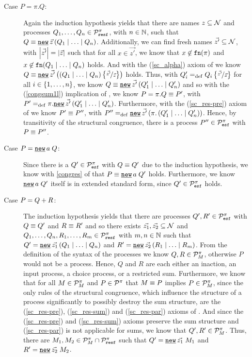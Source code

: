 \begin{prf}
\begin{description}
\begin{description}
\item[Case $P=\pi.Q$:] Again the induction hypothesis yields that there are names $z\subseteq\mathcal N$ and processes $Q_1,\ldots,Q_n\in\mathcal P^{\pi}_{\mathtt{resf}}$, with $n\in\mathbb N$, such that $Q\struct{}\procres[()]{\vec{z}}{\procpar{Q_1}{\procpar{\ldots}{Q_n}}}$. Additionally, we can find fresh names $\vec{z'}\subseteq\mathcal N$, with $\left|\vec{z'}\right|=\left|\vec{z}\right|$ such that for all $x\in{}\vec{z'}$, we know that $x\not\in\mathtt{fn}(\pi)$ and $x\not\in\mathtt{fn}(Q_1 \mid \ldots \mid Q_n)$ holds. And with the (\ref{sc_alpha}) axiom of  we know $Q\struct{}\procres[()]{\vec{z'}}{\left(\procpar{Q_1}{\procpar{\ldots}{Q_n}}\right)\subs{\vec{z'}}{\vec{z}}}$ holds. Thus, with $Q_i'=_{\mathrm{def}}{}Q_i\left\{\nicefrac{\vec{z'}}{\vec{z}}\right\}$ for all $i\in\set{1,\ldots,n}$, we know $Q\struct{}\procres[()]{\vec{z'}}{\procpar{Q_1'}{\procpar{\ldots}{Q_n'}}}$ and so with the (\ref{congsum1l}) implication of , we know $P=\pi.Q\equiv{}{}P'$, with $P'\define\pi.\procres[()]{\vec{z'}}{\procpar{Q_1'}{\procpar{\ldots}{Q_n'}}}$. Furthermore, with the (\ref{sc_res-pre}) axiom of  we know $
P'\equiv{}{}P''$, with $P''\define\procres[()]{\vec{z'}}{\pi.\left(\procpar{Q_1'}{\procpar{\ldots}{Q_n'}}\right)}$. Hence, by transitivity of the structural congruence, there is a process $P''\in\mathcal P^{\pi}_{\mathtt{esf}}$ with $P\equiv{}{}P''$.

\item[Case $P=\procres{a}{Q}$:] Since there is a $Q'\in\mathcal P^{\pi}_{\mathtt{esf}}$ with $Q\equiv{}{}Q'$ due to the induction hypothesis, we know with \ref{congres} of  that $\struct{P}{\procres{a}{Q'}}$ holds. Furthermore, we know $\procres{a}{Q'}$ itself is in extended standard form, since $Q'\in\mathcal P^{\pi}_{\mathtt{esf}}$ holds.

\item[Case $P=Q + R$:] The induction hypothesis yields that there are processes $Q',R'\in\mathcal P^{\pi}_{\mathtt{esf}}$ with $Q\equiv{}{}Q'$ and $R\equiv{}{}R'$ and so there exists $\vec{z_1},\vec{z_2}\subseteq\mathcal N$ and $Q_1,\ldots,Q_n,R_1,\ldots,R_m\in\mathcal P^{\pi}_{\mathtt{resf}}$ with $m,n\in\mathbb N$ such that $Q'=\procres[()]{\vec{z_1}}{\procpar{Q_1}{\procpar{\ldots}{Q_n}}}$ and $R'=\procres[()]{\vec{z_2}}{\procpar{R_1}{\procpar{\ldots}{R_m}}}$. From the definition of the syntax of the \picalc{} processes we know $Q,R\in\mathcal P^{\pi}_{M}$, otherwise $P$ would not be a process. Hence, $Q$ and $R$ are each either an inaction, an input process, a choice process, or a restricted sum. Furthermore, we know that for all $M\in\mathcal P^{\pi}_{M}$ and $P\in\mathcal P^{\pi}$ that $M\equiv{}{}P$ implies $P\in\mathcal P^{\pi}_{M}$, since the only rules of the structural congruence, which influence the structure of a process significantly to possibly destroy the sum structure, are the (\ref{sc_res-pre}), (\ref{sc_res-sum}) and (\ref{sc_res-par}) axioms of . And since the (\ref{sc_res-pre}) and (\ref{sc_res-sum}) axioms preserve the sum structure and (\ref{sc_res-par}) is not applicable for sums, we know that $Q',R'\in\mathcal P^{\pi}_{M}$. Thus, there are $M_1,M_2\in\mathcal P^{\pi}_{M}\cap\mathcal P^{\pi}_{\mathtt{resf}}$ such that $Q'=\procres{\vec{z_1}}{M_1}$ and $R'=\procres{\vec{z_2}}{M_2}$.


\end{description}
\end{description}
\end{prf}
